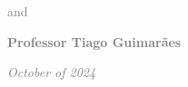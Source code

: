 \begin{titlepage}
\begin{center}
\begin{minipage}{0.3\textwidth}
        \textcolor{gray}{and}
        
        \textcolor{gray}{\textbf{Professor Tiago Guimarães}}
        
    \end{minipage}
    \vfill
    \textcolor{gray}{\textit{October of 2024}} 
\end{center}
\end{titlepage}  
